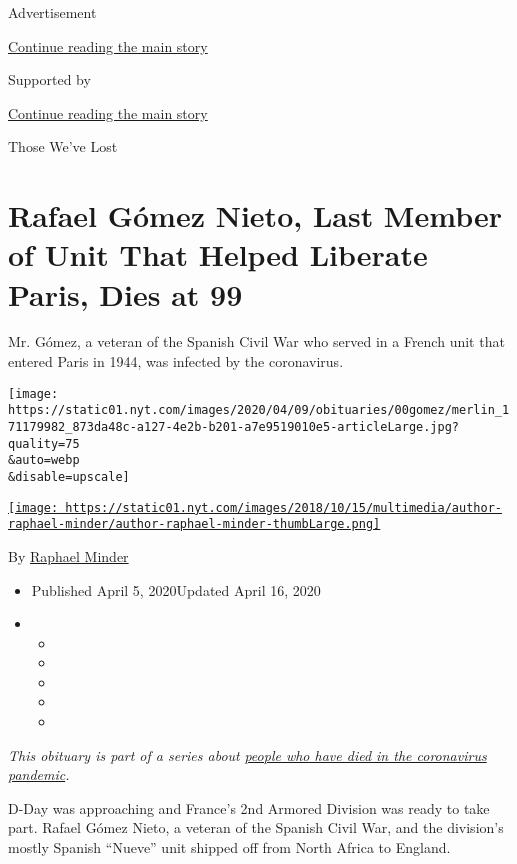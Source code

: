 Advertisement

\protect\hyperlink{after-top}{Continue reading the main story}

Supported by

\protect\hyperlink{after-sponsor}{Continue reading the main story}

Those We've Lost

\hypertarget{rafael-guxf3mez-nieto-last-member-of-unit-that-helped-liberate-paris-dies-at-99}{%
\section{Rafael Gómez Nieto, Last Member of Unit That Helped Liberate
Paris, Dies at
99}\label{rafael-guxf3mez-nieto-last-member-of-unit-that-helped-liberate-paris-dies-at-99}}

Mr. Gómez, a veteran of the Spanish Civil War who served in a French
unit that entered Paris in 1944, was infected by the coronavirus.

\texttt{[image: https://static01.nyt.com/images/2020/04/09/obituaries/00gomez/merlin\_171179982\_873da48c-a127-4e2b-b201-a7e9519010e5-articleLarge.jpg?quality=75\\\&auto=webp\\\&disable=upscale]}

\href{https://www.nytimes.com/by/raphael-minder}{\texttt{[image: https://static01.nyt.com/images/2018/10/15/multimedia/author-raphael-minder/author-raphael-minder-thumbLarge.png]}}

By \href{https://www.nytimes.com/by/raphael-minder}{Raphael Minder}

\begin{itemize}
\item
  Published April 5, 2020Updated April 16, 2020
\item
  \begin{itemize}
  \item
  \item
  \item
  \item
  \item
  \end{itemize}
\end{itemize}

\emph{This obituary is part of a series about}
\href{https://www.nytimes.com/series/people-who-have-died-of-the-coronavirus}{\emph{people
who have died in the coronavirus pandemic}}\emph{.}

D-Day was approaching and France's 2nd Armored Division was ready to
take part. Rafael Gómez Nieto, a veteran of the Spanish Civil War, and
the division's mostly Spanish ``Nueve'' unit shipped off from North
Africa to England.


